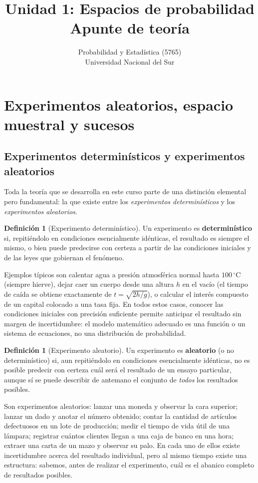 \documentclass[11pt,a4paper]{article}
\title{Unidad 1: Espacios de probabilidad \\ \large Apunte de teoría}
\author{Probabilidad y Estadística (5765) \\ Universidad Nacional del Sur}
\date{}
\theoremstyle{plain}
\theoremstyle{definition}
\newtheorem{definicion}[teorema]{Definición}
\theoremstyle{remark}
\begin{document}
\maketitle
\tableofcontents
\newpage

\section{Experimentos aleatorios, espacio muestral y sucesos}

\subsection{Experimentos determinísticos y experimentos aleatorios}

Toda la teoría que se desarrolla en este curso parte de una distinción elemental pero fundamental: la que existe entre los \emph{experimentos determinísticos} y los \emph{experimentos aleatorios}.

\begin{definicion}[Experimento determinístico]
Un experimento es \textbf{determinístico} si, repitiéndolo en condiciones esencialmente idénticas, el resultado es siempre el mismo, o bien puede predecirse con certeza a partir de las condiciones iniciales y de las leyes que gobiernan el fenómeno.
\end{definicion}

Ejemplos típicos son calentar agua a presión atmosférica normal hasta $100\,^\circ\text{C}$ (siempre hierve), dejar caer un cuerpo desde una altura $h$ en el vacío (el tiempo de caída se obtiene exactamente de $t=\sqrt{2h/g}$), o calcular el interés compuesto de un capital colocado a una tasa fija. En todos estos casos, conocer las condiciones iniciales con precisión suficiente permite anticipar el resultado sin margen de incertidumbre: el modelo matemático adecuado es una función o un sistema de ecuaciones, no una distribución de probabilidad.

\begin{definicion}[Experimento aleatorio]
Un experimento es \textbf{aleatorio} (o no determinístico) si, aun repitiéndolo en condiciones esencialmente idénticas, no es posible predecir con certeza cuál será el resultado de un ensayo particular, aunque sí se puede describir de antemano el conjunto de \emph{todos} los resultados posibles.
\end{definicion}

Son experimentos aleatorios: lanzar una moneda y observar la cara superior; lanzar un dado y anotar el número obtenido; contar la cantidad de artículos defectuosos en un lote de producción; medir el tiempo de vida útil de una lámpara; registrar cuántos clientes llegan a una caja de banco en una hora; extraer una carta de un mazo y observar su palo. En cada uno de ellos existe incertidumbre acerca del resultado individual, pero al mismo tiempo existe una estructura: sabemos, antes de realizar el experimento, cuál es el abanico completo de resultados posibles.
\end{document}
